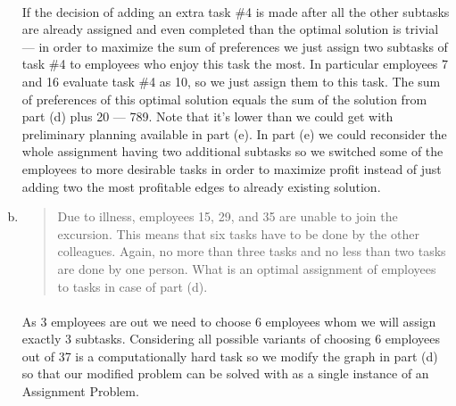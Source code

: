 \begin{enumerate}[(a)]
	\paragraph{}
	If the decision of adding an extra task \#4 is made after all the other subtasks are already assigned and even completed than the optimal solution is trivial --- in order to maximize the sum of preferences we just assign two subtasks of task \#4 to employees who enjoy this task the most. In particular employees 7 and 16 evaluate task \#4 as 10, so we just assign them to this task. The sum of preferences of this optimal solution equals the sum of the solution from part (d) plus 20 --- 789. Note that it's lower than we could get with preliminary planning available in part (e). In part (e) we could reconsider the whole assignment having two additional subtasks so we switched some of the employees to more desirable tasks in order to maximize profit instead of just adding two the most profitable edges to already existing solution.

\item\begin{quote}Due to illness, employees 15, 29, and 35 are unable to join the excursion. This
means that six tasks have to be done by the other colleagues. Again, no more than
three tasks and no less than two tasks are done by one person. What is an optimal
assignment of employees to tasks in case of part (d).\end{quote}

	\paragraph{}
	As 3 employees are out we need to choose 6 employees whom we will assign exactly 3 subtasks. Considering all possible variants of choosing 6 employees out of 37 is a computationally hard task so we modify the graph in part (d) so that our modified problem can be solved with as a single instance of an Assignment Problem.


\end{enumerate}
